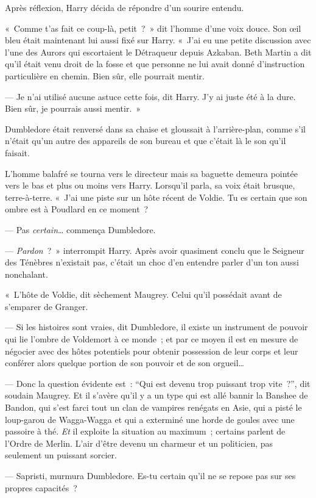 Après réflexion, Harry décida de répondre d'un sourire entendu.

«~Comme t'as fait ce coup-là, petit~?~»
dit l'homme d'une voix douce.
Son œil bleu était maintenant lui aussi fixé sur Harry.
«~J'ai eu une petite discussion avec l'une des Aurors qui escortaient le Détraqueur depuis Azkaban.
Beth Martin a dit qu'il était venu droit de la fosse et que personne ne lui avait donné d'instruction particulière en chemin.
Bien sûr, elle pourrait mentir.

--- Je n'ai utilisé aucune astuce cette fois, dit Harry.
J'y ai juste été à la dure.
Bien sûr, je pourrais aussi mentir.~»

Dumbledore était renversé dans sa chaise et gloussait à l'arrière-plan, comme s'il n'était qu'un autre des appareils de son bureau et que c'était là le son qu'il faisait.

L'homme balafré se tourna vers le directeur mais sa baguette demeura pointée vers le bas et plus ou moins vers Harry.
Lorsqu'il parla, sa voix était brusque, terre-à-terre.
«~J'ai une piste sur un hôte récent de Voldie.
Tu es certain que son ombre est à Poudlard en ce moment~?

--- Pas \emph{certain}… commença Dumbledore.

--- \emph{Pardon}~?~»
interrompit Harry.
Après avoir quasiment conclu que le Seigneur des Ténèbres n'existait pas, c'était un choc d'en entendre parler d'un ton aussi nonchalant.

«~L'hôte de Voldie, dit sèchement Maugrey.
Celui qu'il possédait avant de s'emparer de Granger.

--- Si les histoires sont vraies, dit Dumbledore, il existe un instrument de pouvoir qui lie l'ombre de Voldemort à ce monde~; et par ce moyen il est en mesure de négocier avec des hôtes potentiels pour obtenir possession de leur corps et leur conférer alors quelque portion de son pouvoir et de son orgueil…

--- Donc la question évidente est~: “Qui est devenu trop puissant trop vite~?”, dit soudain Maugrey.
Et il s'avère qu'il y a un type qui est allé bannir la Banshee de Bandon, qui s'est farci tout un clan de vampires renégats en Asie, qui a pisté le loup-garou de Wagga-Wagga et qui a exterminé une horde de goules avec une passoire à thé.
\emph{Et} il exploite la situation au maximum~; certains parlent de l'Ordre de Merlin.
L'air d'être devenu un charmeur et un politicien, pas seulement un puissant sorcier.

--- Sapristi, murmura Dumbledore.
Es-tu certain qu'il ne se repose pas sur ses propres capacités~?

